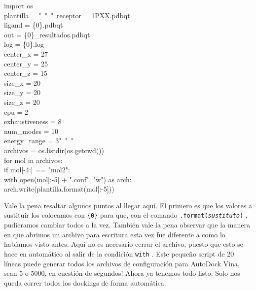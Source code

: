 \documentclass[10pt,letterpaper]{article}
\newcommand{\inlinecode}[1]{
\colorbox{light-gray}{\texttt{#1}}
}
\newenvironment{Code}
{
\begin{lrbox}{\selvestebox}%
\begin{minipage}{\dimexpr\columnwidth-2\fboxsep\relax}
\fontfamily{\ttdefault}\selectfont
}
{\end{minipage}\end{lrbox}%
\begin{center}
\colorbox{light-gray}{\usebox{\selvestebox}}
\end{center}
}
\begin{document}
\begin{footnotesize}
\begin{Code}
import os\\
plantilla = "\ \hspace*{-1.5mm}"\ \hspace*{-1.5mm}"\ \hspace*{-1.5mm}receptor = 1PXX.pdbqt\\
ligand = \{0\}.pdbqt\\
out = \{0\}\_resultados.pdbqt\\
log = \{0\}.log\\
center\_x = 27\\
center\_y = 25\\
center\_z = 15\\
size\_x = 20\\
size\_y = 20\\
size\_z = 20\\
cpu = 2\\
exhaustiveness = 8\\
num\_modes = 10\\
energy\_range = 3"\ \hspace*{-1.5mm}"\ \hspace*{-1.5mm}"\\
archivos = os.listdir(os.getcwd())\\
for mol in archivos:\\
\hspace*{6mm}if mol[-4:] == "mol2":\\
\hspace*{12mm}with open(mol[:-5] + ".conf", "w") as arch:\\
\hspace*{18mm}arch.write(plantilla.format(mol[:-5]))
\end{Code}
\end{footnotesize}

Vale la pena resaltar algunos puntos al llegar aqu\'i. El primero es que los valores a sustituir los colocamos con \inlinecode{\{0\}} para que, con el comando \inlinecode{.format(\emph{sustituto})}, pudieramos cambiar todos a la vez. Tambi\'en vale la pena observar que la manera en que abrimos un archivo para escritura esta vez fue diferente a como lo hab\'iamos visto antes. Aqu\'i no es necesario cerrar el archivo, puesto que esto se hace en autom\'atico al salir de la condici\'on \inlinecode{with}. Este peque\~no script de 20 l\'ineas puede generar todos los archivos de configuraci\'on para AutoDock Vina, sean 5 o 5000, en cuesti\'on de segundos! Ahora ya tenemos todo listo. Solo nos queda correr todos los dockings de forma autom\'atica.\\
\end{document}
